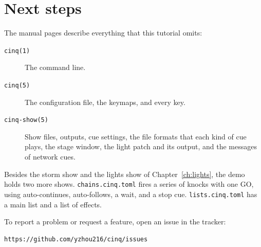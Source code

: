 %

\chapter{Next steps}
\label{ch:next}

The manual pages describe everything that this tutorial omits:

\begin{description}
\item[\texttt{cinq(1)}] The command line.
\item[\texttt{cinq(5)}] The configuration file, the keymaps, and every key.
\item[\texttt{cinq-show(5)}] Show files, outputs, cue settings, the file
  formats that each kind of cue plays, the stage window, the light patch and
  its output, and the messages of network cues.
\end{description}

Besides the storm show and the lights show of Chapter~\ref{ch:lights}, the
demo holds two more shows.  \texttt{chains.cinq.toml} fires a series of
knocks with one GO, using auto-continues, auto-follows, a wait, and a stop
cue.  \texttt{lists.cinq.toml} has a main list and a list of effects.

To report a problem or request a feature, open an issue in the tracker:

\begin{verbatim}
https://github.com/yzhou216/cinq/issues
\end{verbatim}
